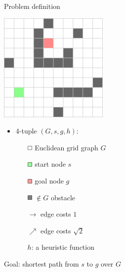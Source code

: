 \documentclass{presentation}
\newcommand{\rect}[1]{\tikz{\path[draw=black,fill=#1] (0,0) rectangle (2mm,2mm);}}
\newcommand{\grect}{\rect{white!60!green}}
\newcommand{\rrect}{\rect{white!60!red}}
\newcommand{\wrect}{\rect{white}}
\newcommand{\brect}{\rect{gray}}
\begin{document}
\begin{frame}{Problem definition}
	\begin{minipage}{0.3\textwidth}

	\includegraphics[width=\textwidth]{figures/gridgraph.png}

	\end{minipage}%
	\hfill%
	\begin{minipage}{0.6\textwidth}

	\begin{itemize}
		\item 4-tuple $(G, s, g, h)$:
		\pause
		\begin{itemize}
		\item[$\wrect$] Euclidean grid graph $G$
		\item[$\grect$] start node $s$
		\item[$\rrect$] goal node $g$
		\item[$\brect$] $\not\in G$ obstacle
		\pause
		\item[$\rightarrow$] edge costs $1$
		\item[$\nearrow$] edge costs $\sqrt{2}$
		\pause
		\item[$h$:] a heuristic function
		\end{itemize}
	\end{itemize}

	\end{minipage}

	\hspace{3cm}

	\pause
	\begin{center}
		Goal: shortest path from $s$ to $g$ over $G$
	\end{center}

\end{frame}
\end{document}
